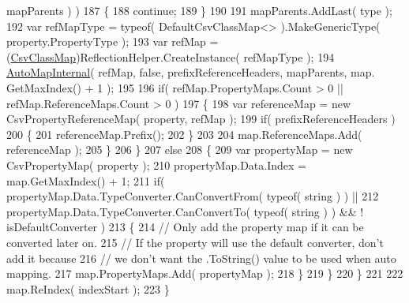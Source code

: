 \begin{DoxyCode}
      mapParents ) )
187                     \{
188                         \textcolor{keywordflow}{continue};
189                     \}
190 
191                     mapParents.AddLast( type );
192                     var refMapType = typeof( DefaultCsvClassMap<> ).MakeGenericType( property.PropertyType 
      );
193                     var refMap = (\hyperlink{a00040_affc5ae8f2b0406d496bcbdf246da6210}{CsvClassMap})ReflectionHelper.CreateInstance( refMapType );
194                     \hyperlink{a00040_a16b5bb84064e86c2b319348d8a42693d}{AutoMapInternal}( refMap, \textcolor{keyword}{false}, prefixReferenceHeaders, mapParents, map.
      GetMaxIndex() + 1 );
195 
196                     \textcolor{keywordflow}{if}( refMap.PropertyMaps.Count > 0 || refMap.ReferenceMaps.Count > 0 )
197                     \{
198                         var referenceMap = \textcolor{keyword}{new} CsvPropertyReferenceMap( property, refMap );
199                         \textcolor{keywordflow}{if}( prefixReferenceHeaders )
200                         \{
201                             referenceMap.Prefix();
202                         \}
203 
204                         map.ReferenceMaps.Add( referenceMap );
205                     \}
206                 \}
207                 \textcolor{keywordflow}{else}
208                 \{
209                     var propertyMap = \textcolor{keyword}{new} CsvPropertyMap( property );
210                     propertyMap.Data.Index = map.GetMaxIndex() + 1;
211                     \textcolor{keywordflow}{if}( propertyMap.Data.TypeConverter.CanConvertFrom( typeof( \textcolor{keywordtype}{string} ) ) ||
212                         propertyMap.Data.TypeConverter.CanConvertTo( typeof( \textcolor{keywordtype}{string} ) ) && !
      isDefaultConverter )
213                     \{
214                         \textcolor{comment}{// Only add the property map if it can be converted later on.}
215                         \textcolor{comment}{// If the property will use the default converter, don't add it because}
216                         \textcolor{comment}{// we don't want the .ToString() value to be used when auto mapping.}
217                         map.PropertyMaps.Add( propertyMap );
218                     \}
219                 \}
220             \}
221 
222             map.ReIndex( indexStart );
223         \}
\end{DoxyCode}
